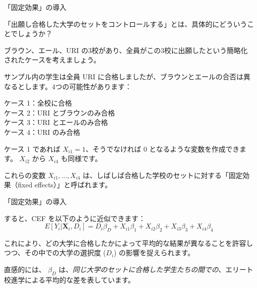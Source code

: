 \documentclass[11pt,handout]{beamer}
\newenvironment{wideitemize}{\itemize\addtolength{\itemsep}{10pt}}{\enditemize}
\begin{document}
\begin{frame}{「固定効果」の導入}

\begin{wideitemize}
	\item
	「出願し合格した大学のセットをコントロールする」とは、具体的にどういうことでしょうか？
	
	\pause
	\item
	ブラウン、エール、URI の3校があり、全員がこの3校に出願したという簡略化されたケースを考えましょう。
	
	
	\pause
	\item
	サンプル内の学生は全員 URI に合格しましたが、ブラウンとエールの合否は異なるとします。4つの可能性があります： \\ \pause
	
	ケース 1：全校に合格 \\
	ケース 2：URI とブラウンのみ合格 \\
	ケース 3：URI とエールのみ合格 \\
	ケース 4：URI のみ合格 \\
	
	\pause
	\item
	ケース 1 であれば $X_{i1} = 1$、そうでなければ 0 となるような変数を作成できます。 $X_{i2}$ から $X_{i4}$ も同様です。
	
	
	\pause
	\item
	これらの変数 $X_{i1}, \dots, X_{i4}$ は、しばしば合格した学校のセットに対する「固定効果（fixed effects）」と呼ばれます。
	
	
\end{wideitemize}
\end{frame} 

\begin{frame}{「固定効果」の導入}
	
\begin{wideitemize}
	\item
	すると、CEF を以下のように近似できます：
	$$E[Y_i | \bm{X}_i , D_i ] = D_i \beta_D  + X_{i1} \beta_1 + X_{i2} \beta_2 + X_{i3} \beta_3 + X_{i4} \beta_4 $$
	
	\pause
	\item これにより、どの大学に合格したかによって平均的な結果が異なることを許容しつつ、その中での大学の選択度 ($D_i $) の影響を捉えられます。
	
	\pause
	\item
	直感的には、 $\beta_D$ は、\textit{同じ大学のセットに合格した学生たちの間での}、エリート校進学による平均的な差を表しています。
\end{wideitemize}	
	
\end{frame}
\end{document}
